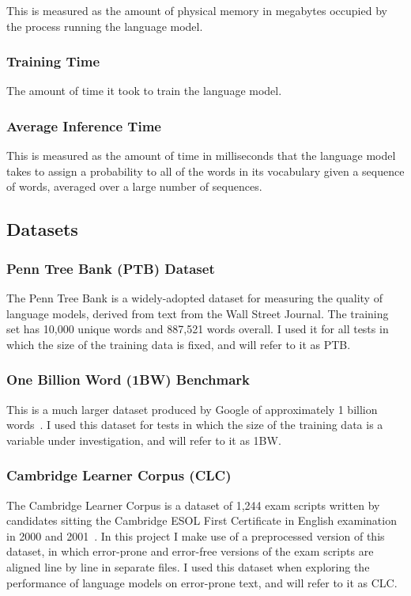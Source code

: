 \documentclass[a4paper, 12pt]{report}
\begin{document}
This is measured as the amount of physical memory in megabytes occupied by the process running the language model.

\subsubsection{Training Time}

The amount of time it took to train the language model.

\subsubsection{Average Inference Time}

This is measured as the amount of time in milliseconds that the language model takes to assign a probability to all of the words in its vocabulary given a sequence of words, averaged over a large number of sequences.

\subsection{Datasets}

\subsubsection{Penn Tree Bank (PTB) Dataset}

The Penn Tree Bank is a widely-adopted dataset for measuring the quality of language models, derived from text from the Wall Street Journal. The training set has 10,000 unique words and 887,521 words overall. I used it for all tests in which the size of the training data is fixed, and will refer to it as PTB.

\subsubsection{One Billion Word (1BW) Benchmark}

This is a much larger dataset produced by Google of approximately 1 billion words~\cite{1bw:chelba2013}. I used this dataset for tests in which the size of the training data is a variable under investigation, and will refer to it as 1BW.

\subsubsection{Cambridge Learner Corpus (CLC)}

The Cambridge Learner Corpus is a dataset of 1,244 exam scripts written by candidates sitting the Cambridge ESOL First Certificate in English examination in 2000 and 2001~\cite{clc:yannakoudakis2011}. In this project I make use of a preprocessed version of this dataset, in which error-prone and error-free versions of the exam scripts are aligned line by line in separate files. I used this dataset when exploring the performance of language models on error-prone text, and will refer to it as CLC.
\end{document}
